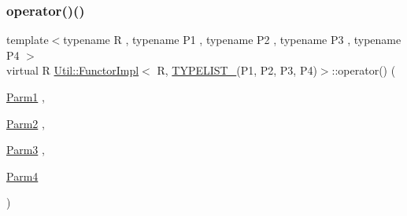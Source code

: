 \mbox{\label{classUtil_1_1FunctorImpl_3_01R_00_01TYPELIST__4_07P1_00_01P2_00_01P3_00_01P4_08_4_ad5c77ea15e9101b061099c9caaeba2be}} 
\subsubsection{\texorpdfstring{operator()()}{operator()()}\hspace{0.1cm}{\footnotesize\ttfamily [2/3]}}
{\footnotesize\ttfamily template$<$typename R , typename P1 , typename P2 , typename P3 , typename P4 $>$ \\
virtual R \mbox{\hyperlink{classUtil_1_1FunctorImpl}{Util\+::\+Functor\+Impl}}$<$ R, \mbox{\hyperlink{adat__devel__install_2include_2adat_2typelist_8h_a7a156c571ab21a16b0495e1c882a07fa}{T\+Y\+P\+E\+L\+I\+S\+T\+\_}}(P1, P2, P3, P4)$>$\+::operator() (\begin{DoxyParamCaption}\item[{\mbox{\hyperlink{structUtil_1_1Private_1_1FunctorImplBase_a9d61e693d6c616dea5bd9d9073c7d21a}{Parm1}}}]{,  }\item[{\mbox{\hyperlink{structUtil_1_1Private_1_1FunctorImplBase_a554085cd798ef14838a59b528f0feb2e}{Parm2}}}]{,  }\item[{\mbox{\hyperlink{structUtil_1_1Private_1_1FunctorImplBase_a052148e627fd4caecbcffdbdf1033dbb}{Parm3}}}]{,  }\item[{\mbox{\hyperlink{structUtil_1_1Private_1_1FunctorImplBase_a1ad7fe3f243480c44a610927ebe76762}{Parm4}}}]{ }\end{DoxyParamCaption})\hspace{0.3cm}{\ttfamily [pure virtual]}}

\mbox{\label{classUtil_1_1FunctorImpl_3_01R_00_01TYPELIST__4_07P1_00_01P2_00_01P3_00_01P4_08_4_ad5c77ea15e9101b061099c9caaeba2be}} 
